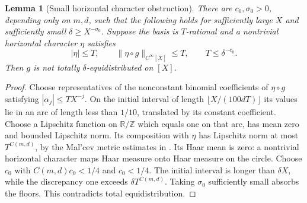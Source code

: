 \documentclass[11pt]{article}
\newtheorem{lemma}[theorem]{Lemma}
\theoremstyle{definition}
\theoremstyle{remark}
\begin{document}
\begin{lemma}[Small horizontal character obstruction]\label{lem:gn-horizontal-obstruction}
There are $c_0,\sigma_0>0$, depending only on $m,d$, such that the
following holds for sufficiently large $X$ and sufficiently small
$\delta\geq X^{-\sigma_0}$. Suppose the basis is $T$-rational and
a nontrivial horizontal character $\eta$ satisfies
\[
 |\eta|\leq T,\qquad \|\eta\circ g\|_{C^\infty[X]}\leq T,
 \qquad T\leq\delta^{-c_0}.
\]
Then $g$ is not totally $\delta$-equidistributed on $[X]$.
\end{lemma}
\begin{proof}
Choose representatives of the nonconstant binomial coefficients of
$\eta\circ g$ satisfying $|\alpha_j|\leq TX^{-j}$. On the initial
interval of length $\lfloor X/(100dT)\rfloor$ its values lie in an arc
of length less than $1/10$, translated by its constant coefficient.
Choose a Lipschitz function on $\mathbb R/\mathbb Z$ which equals one on
that arc, has mean zero and bounded Lipschitz norm. Its composition with
$\eta$ has Lipschitz norm at most $T^{C(m,d)}$, by the Mal'cev metric
estimates in \cite[Appendix A]{GTOrbits2012}. Its Haar mean is zero:
a nontrivial horizontal character maps Haar measure onto Haar measure
on the circle. Choose $c_0$ with $C(m,d)c_0<1/4$ and $c_0<1/4$.
The initial interval is longer than $\delta X$, while the discrepancy
one exceeds $\delta T^{C(m,d)}$. Taking $\sigma_0$ sufficiently small
absorbs the floors. This contradicts total equidistribution.
\end{proof}
\end{document}

